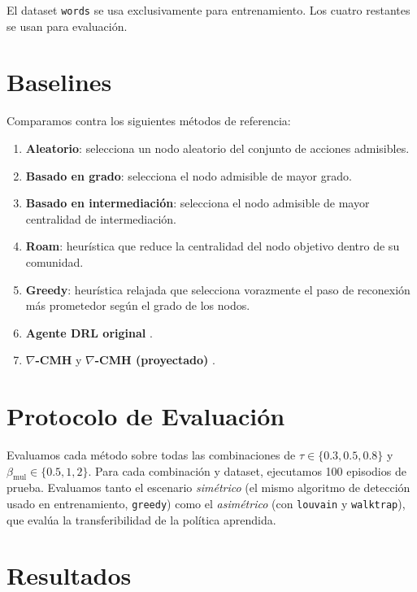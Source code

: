 \documentclass[11pt,a4paper,twoside]{tesis}
\begin{document}

El dataset \texttt{words} se usa exclusivamente para entrenamiento. Los cuatro restantes
se usan para evaluación.

\section{Baselines}
\label{sec:baselines}

Comparamos contra los siguientes métodos de referencia:
\begin{enumerate}
    \item \textbf{Aleatorio}: selecciona un nodo aleatorio del conjunto de acciones admisibles.
    \item \textbf{Basado en grado}: selecciona el nodo admisible de mayor grado.
    \item \textbf{Basado en intermediación}: selecciona el nodo admisible de mayor
          centralidad de intermediación.
    \item \textbf{Roam}: heurística que reduce la centralidad del nodo objetivo dentro
          de su comunidad.
    \item \textbf{Greedy}: heurística relajada que selecciona vorazmente el paso de
          reconexión más prometedor según el grado de los nodos.
    \item \textbf{Agente DRL original} \cite{bernini-2024}.
    \item \textbf{$\nabla$-CMH} y \textbf{$\nabla$-CMH (proyectado)}
          \cite{silvestri2025righthidemaskingcommunity}.
\end{enumerate}

\section{Protocolo de Evaluación}
\label{sec:protocolo}

Evaluamos cada método sobre todas las combinaciones de $\tau \in \{0.3, 0.5, 0.8\}$ y
$\beta_{\mathrm{mul}} \in \{0.5, 1, 2\}$. Para cada combinación y dataset, ejecutamos
100 episodios de prueba. Evaluamos tanto el escenario \emph{simétrico} (el mismo
algoritmo de detección usado en entrenamiento, \texttt{greedy}) como el
\emph{asimétrico} (con \texttt{louvain} y \texttt{walktrap}), que evalúa la
transferibilidad de la política aprendida.

\section{Resultados}
\label{sec:resultados}
\end{document}
